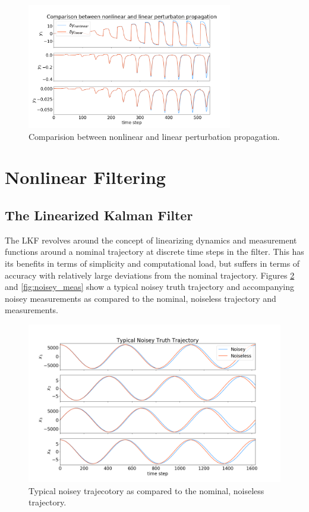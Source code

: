 \documentclass[11pt, a4paper]{article}
\begin{document}
\begin{figure}[H]
	\centering
	\includegraphics[width=0.8\textwidth]{./Figures/nonlvl_meas.png}
	\caption{Comparision between nonlinear and linear perturbation propagation.}
	\label{fig:nlvl_m}
\end{figure}


\section{Nonlinear Filtering}

\subsection{The Linearized Kalman Filter}
The LKF revolves around the concept of linearizing dynamics and measurement functions around a nominal trajectory at discrete time steps in the filter. 
This has its benefits in terms of simplicity and computational load, but suffers in terms of accuracy with relatively large deviations from the nominal trajectory. 
Figures \ref{fig:noisey_states} and \ref{fig:noisey_meas} show a typical noisey truth trajectory and accompanying noisey measurements as compared to the nominal, noiseless trajectory and measurements.  

\begin{figure}[H]
	\centering
	\includegraphics[width=\textwidth]{Figures/noisey_truth.png}
	\caption{Typical noisey trajecotory as compared to the nominal, noiseless trajectory.}
	\label{fig:noisey_states}
\end{figure}
\end{document}
